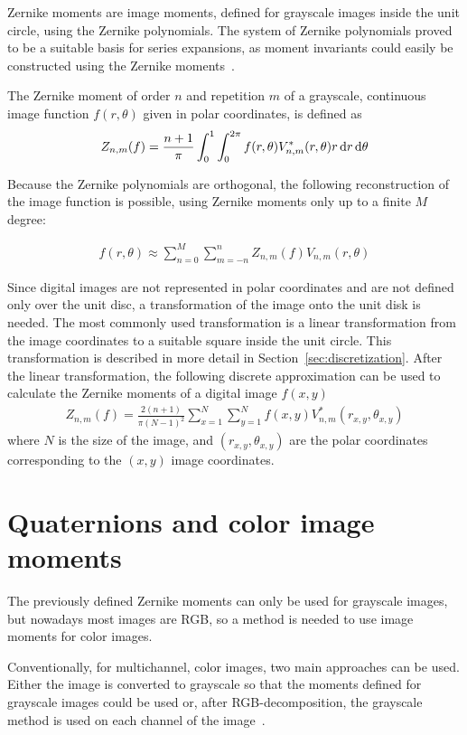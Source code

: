 Zernike moments are image moments, defined for grayscale images inside the unit circle, using the Zernike polynomials.
The system of Zernike polynomials proved to be a suitable basis for series expansions, as moment invariants could easily be constructed using the Zernike moments~\cite{zernike_moments}. 

The Zernike moment of order $n$ and repetition $m$ of a grayscale, continuous image function $f(r,\theta)$ given in polar coordinates, is defined as
\begin{gather*}
  Z_{n,m}(f) = \frac{n + 1}{\pi}\int_0^1\int_0^{2\pi}f(r,\theta)V_{n,m}^{*}(r,\theta)r\dif r\dif\theta
\end{gather*}

Because the Zernike polynomials are orthogonal, the following reconstruction of the image function is possible, using Zernike moments only up to a finite $M$ degree:

\begin{gather*}
  f(r,\theta) \approx \sum_{n=0}^{M}\sum_{m=-n}^{n}Z_{n,m}(f)V_{n,m}(r,\theta)
\end{gather*}

Since digital images are not represented in polar coordinates and are not defined only over the unit disc, a transformation of the image onto the unit disk is needed. The most commonly used transformation is a linear transformation from the image coordinates to a suitable square inside the unit circle. This transformation is described in more detail in Section~\ref{sec:discretization}.
After the linear transformation, the following discrete approximation can be used to calculate the Zernike moments of a digital image $f(x,y)$
\begin{gather*}
  Z_{n,m}(f) = \frac{2(n+1)}{\pi(N-1)^2}\sum_{x=1}^{N}\sum_{y=1}^{N}f(x,y)V_{n,m}^{*}(r_{x,y},\theta_{x,y})
\end{gather*}
where $N$ is the size of the image, and $(r_{x,y},\theta_{x,y})$ are the polar coordinates corresponding to the $(x,y)$ image coordinates.

\section{Quaternions and color image moments}
The previously defined Zernike moments can only be used for grayscale images, but nowadays most images are RGB, so a method is needed to use image moments for color images.

Conventionally, for multichannel, color images, two main approaches can be used. Either the image is converted to grayscale so that the moments defined for grayscale images could be used or, after RGB-decomposition, the grayscale method is used on each channel of the image~\cite{affine_color}.

